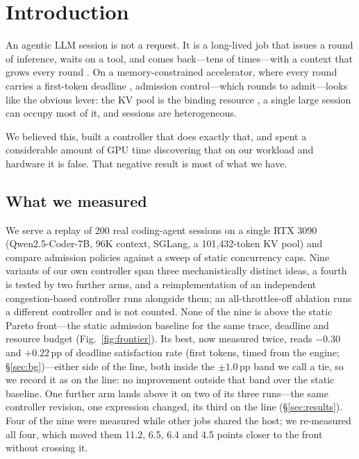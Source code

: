 \section{Introduction}
\label{sec:intro}

An agentic LLM session is not a request. It is a long-lived job that issues a
round of inference, waits on a tool, and comes back---tens of times---with a
context that grows every round \cite{zhu2026tracelab,continuum,talaria}. On a
memory-constrained accelerator, where every round carries a first-token deadline
\cite{lmjamming}, admission control---which rounds to admit---looks like the
obvious lever: the KV pool is the binding resource
\cite{kwon2023pagedattention,zerowsap,rtswap}, a single large session can occupy
most of it, and sessions are heterogeneous.

We believed this, built a controller that does exactly that, and spent a
considerable amount of GPU time discovering that on our workload and hardware it
is false. That negative result is most of what we have.

\subsection{What we measured}

We serve a replay of 200 real coding-agent sessions on a single RTX 3090
(Qwen2.5-Coder-7B, 96K context, SGLang, a 101{,}432-token KV pool) and compare
admission policies against a sweep of static concurrency caps. Nine variants of
our own controller span three mechanistically distinct ideas, a fourth is tested
by two further arms, and a reimplementation of an independent congestion-based
controller \cite{concur} runs alongside them; an all-throttles-off ablation runs
a different controller and is not counted. None of the nine is above the static
Pareto front---the static admission baseline for the same trace, deadline and
resource budget (Fig.~\ref{fig:frontier}). Its best, now measured twice, reads
$-0.30$ and $+0.22$\,pp of deadline satisfaction rate (first tokens, timed from
the engine; \S\ref{sec:bg})---either side of the line,
both inside the $\pm1.0$\,pp band we call a tie, so we record it as on the line:
no improvement outside that band over the static baseline. One further arm lands above it
on two of its three runs---the same controller revision, one expression
changed, its third on the line (\S\ref{sec:results}). Four of the nine were measured while other jobs
shared the host; we re-measured all four, which moved them 11.2, 6.5, 6.4 and
4.5 points closer to the front without crossing it.

